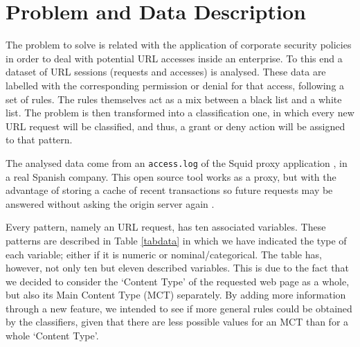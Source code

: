 \documentclass{llncs}
\begin{document}
%

\section{Problem and Data Description}
\label{sec:problemDescription}

\noindent The problem to solve is related with the application of corporate security policies in order to deal with potential URL accesses inside an enterprise. To this end a dataset of URL sessions (requests and accesses) is analysed. These data are labelled with the corresponding permission or denial for that access, following a set of rules. The rules themselves act as a mix between a black list and a white list. The problem is then transformed into a classification one, in which every new URL request will be classified, and thus, a grant or deny action will be assigned to that pattern.

The analysed data come from an \texttt{access.log} of the Squid proxy application \cite{squid:site}, in a real Spanish company. This open source tool works as a proxy, but with the advantage of storing a cache of recent transactions so future requests may be answered without asking the origin server again \cite{DuaneWessels2004}.  

Every pattern, namely an URL request, has ten associated variables. These patterns are described in Table \ref{tabdata} in which we have indicated the type of  each variable; either if it is numeric or nominal/categorical. The table has, however, not only ten but eleven described variables. This is due to the fact that we decided to consider the `Content Type' of the requested web page as a whole, but also its Main Content Type (MCT) separately. By adding more information through a new feature, we intended to see if more general rules could be obtained by the classifiers, given that there are less possible values for an MCT than for a whole `Content Type'.

 
\end{document}

